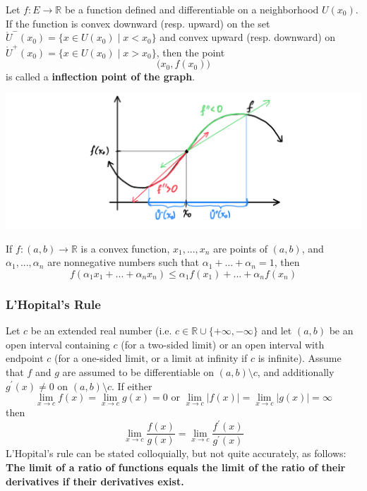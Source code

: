\documentclass{article}
\begin{document}
    \begin{definition}
      Let $f: E \longrightarrow \mathbb{R}$ be a function defined and differentiable on a neighborhood $U(x_0)$. If the function is convex downward (resp. upward) on the set $\mathring{U}^- (x_0) = \{x \in U(x_0) \;|\; x < x_0\}$ and convex upward (resp. downward) on $\mathring{U}^+ (x_0) = \{x \in U(x_0)\;|\; x > x_0\}$, then the point 
      \[\big( x_0, f(x_0) \big)\]
      is called a \textbf{inflection point of the graph}. 
      \begin{center}
          \includegraphics[scale=0.25]{img/Inflection_Point_Analysis.PNG}
      \end{center}
    \end{definition}

    \begin{proposition}
    If $f: (a, b) \longrightarrow \mathbb{R}$ is a convex function, $x_1, ..., x_n$ are points of $(a, b)$, and $\alpha_1, ..., \alpha_n$ are nonnegative numbers such that $\alpha_1 + ... + \alpha_n = 1$, then 
    \[f(\alpha_1 x_1 + ... + \alpha_n x_n) \leq \alpha_1 f(x_1) + ... + \alpha_n f(x_n)\]
    \end{proposition}

    \subsubsection{L'Hopital's Rule}

    \begin{theorem}
    Let $c$ be an extended real number (i.e. $c \in \mathbb{R} \cup \{+\infty, -\infty\}$ and let $(a, b)$ be an open interval containing $c$ (for a two-sided limit) or an open interval with endpoint $c$ (for a one-sided limit, or a limit at infinity if $c$ is infinite). Assume that $f$ and $g$ are assumed to be differentiable on $(a, b) \setminus c$, and additionally $g^\prime (x) \neq 0$ on $(a, b) \setminus c$. If either 
    \[\lim_{x \rightarrow c} f(x) = \lim_{x \rightarrow c} g(x) = 0 \text{ or } \lim_{x \rightarrow c} |f(x)| = \lim_{x \rightarrow c} |g(x)| = \infty\]
    then 
    \[\lim_{x \rightarrow c} \frac{f(x)}{g(x)} = \lim_{x \rightarrow c} \frac{f^\prime (x)}{g^\prime (x)}\]
    L'Hopital's rule can be stated colloquially, but not quite accurately, as follows: \textbf{The limit of a ratio of functions equals the limit of the ratio of their derivatives if their derivatives exist.}
    \end{theorem}
\end{document}
